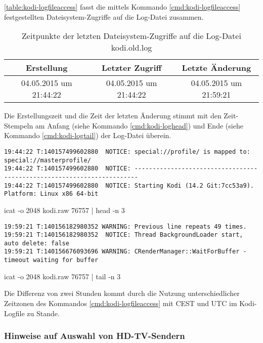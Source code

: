 \autoref{table:kodi-logfileaccess} fasst die mittels Kommando \autoref{cmd:kodi-logfileaccess} festgestellten Dateisystem-Zugriffe auf die Log-Datei zusammen.

\begin{table}[H]
\begin{tabular}{ccc}
\toprule
Erstellung & Letzter Zugriff & Letzte Änderung \\ 
\midrule
04.05.2015 um 21:44:22 & 04.05.2015 um 21:44:22 & 04.05.2015 um 21:59:21 \\ 
\bottomrule
\end{tabular}
\caption{Zeitpunkte der letzten Dateisystem-Zugriffe auf die Log-Datei kodi.old.log}
\label{table:kodi-logfileaccess}
\end{table}

Die Erstellungszeit und die Zeit der letzten Änderung stimmt mit den Zeit-Stempeln am Anfang (siehe Kommando \autoref{cmd:kodi-loghead}) und Ende (siehe Kommando \autoref{cmd:kodi-logtail}) der Log-Datei überein.

\begin{cmd}[H]
\begin{Verbatim}[fontsize=\tiny]
19:44:22 T:140157499602880  NOTICE: special://profile/ is mapped to: special://masterprofile/
19:44:22 T:140157499602880  NOTICE: -----------------------------------------------------------------------
19:44:22 T:140157499602880  NOTICE: Starting Kodi (14.2 Git:7cc53a9). Platform: Linux x86 64-bit
\end{Verbatim}
\caption{icat -o 2048 kodi.raw 76757 | head -n 3}
\label{cmd:kodi-loghead}
\end{cmd}

\begin{cmd}[H]
\begin{Verbatim}[fontsize=\tiny]
19:59:21 T:140156182980352 WARNING: Previous line repeats 49 times.
19:59:21 T:140156182980352  NOTICE: Thread BackgroundLoader start, auto delete: false
19:59:21 T:140156676093696 WARNING: CRenderManager::WaitForBuffer - timeout waiting for buffer
\end{Verbatim}
\caption{icat -o 2048 kodi.raw 76757 | tail -n 3}
\label{cmd:kodi-logtail}
\end{cmd}

Die Differenz von zwei Stunden kommt durch die Nutzung unterschiedlicher Zeitzonen des Kommandos \autoref{cmd:kodi-logfileaccess} mit CEST und UTC im Kodi-Logfile zu Stande.

\subsubsection{Hinweise auf Auswahl von HD-TV-Sendern}

